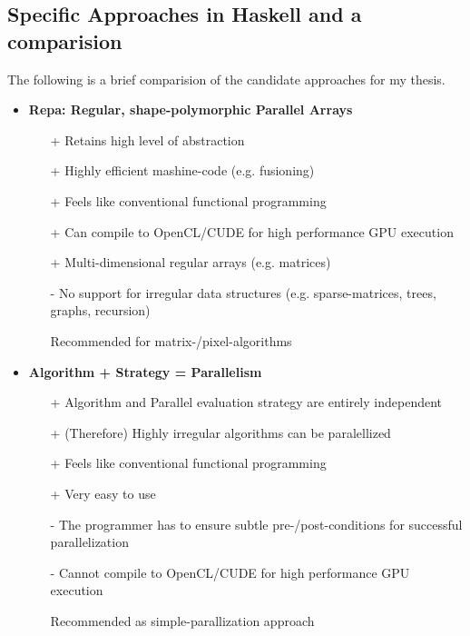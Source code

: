 \documentclass{article}
\begin{document}
    \subsection{Specific Approaches in Haskell and a comparision}
    The following is a brief comparision of the candidate approaches for my thesis.
    \begin{itemize}
    \item \textbf{Repa: Regular, shape-polymorphic Parallel Arrays}
        \begin{itemize}
            \item[+] Retains high level of abstraction
            \item[+] Highly efficient mashine-code (e.g. fusioning)
            \item[+] Feels like conventional functional programming
            \item[+] Can compile to OpenCL/CUDE for high performance GPU execution
            \item[+] Multi-dimensional regular arrays (e.g. matrices)
            \item[-] No support for irregular data structures (e.g. sparse-matrices, trees, graphs, recursion)
            \item[\textbullet] Recommended for matrix-/pixel-algorithms 
        \end{itemize}
        
    \item \textbf{ Algorithm + Strategy = Parallelism}
        \begin{itemize}
            \item[+] Algorithm and Parallel evaluation strategy are entirely independent
            \item[+] (Therefore) Highly irregular algorithms can be paralellized
            \item[+] Feels like conventional functional programming
            \item[+] Very easy to use 
            \item[-] The programmer has to ensure subtle pre-/post-conditions for successful parallelization
            \item[-] Cannot compile to OpenCL/CUDE for high performance GPU execution
            \item[\textbullet] Recommended as simple-parallization approach
        \end{itemize}
        

\end{itemize}
\end{document}
